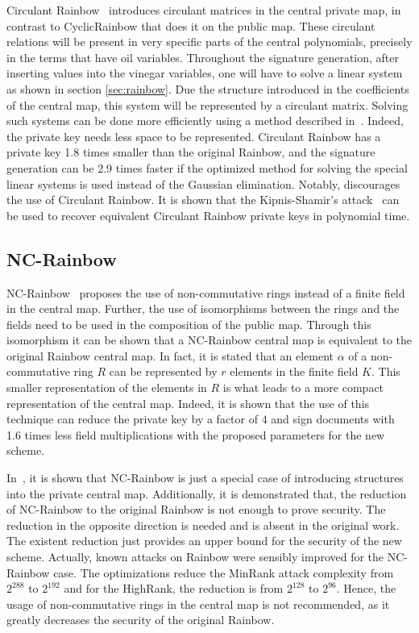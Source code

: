 \documentclass{ufsctex/ufsctex}
\begin{document}
Circulant Rainbow~\cite{peng2017circulant} introduces circulant matrices in the
central private map, in contrast to CyclicRainbow that does it on the public
map. These circulant relations will be present in very specific parts of the
central polynomials, precisely in the terms that have oil variables. Throughout
the signature generation, after inserting values into the vinegar variables,
one will have to solve a linear system as shown in section \ref{sec:rainbow}.
Due the structure introduced in the coefficients of the central map, this
system will be represented by a circulant matrix. Solving such systems can be
done more efficiently using a method described in~\cite{peng2017circulant}.
Indeed, the private key needs less space to be represented. Circulant Rainbow
has a private key 1.8 times smaller than the original Rainbow, and the
signature generation can be 2.9 times faster if the optimized method for
solving the special linear systems is used instead of the Gaussian elimination.
Notably, \cite{hashimoto2018security} discourages the use of Circulant Rainbow.
It is shown that the Kipnis-Shamir's attack~\cite{kipnis1998cryptanalysis} can
be used to recover equivalent Circulant Rainbow private keys in polynomial
time.

\subsection{NC-Rainbow}

NC-Rainbow~\cite{yasuda2012reducing} proposes the use of non-commutative rings
instead of a finite field in the central map. Further, the use of isomorphisms
between the rings and the fields need to be used in the composition of the
public map. Through this isomorphism it can be shown that a NC-Rainbow central
map is equivalent to the original Rainbow central map. In fact, it is stated
that an element $\alpha$ of a non-commutative ring $R$ can be represented by
$r$ elements in the finite field $K$. This smaller representation of the
elements in $R$ is what leads to a more compact representation of the central
map. Indeed, it is shown that the use of this technique can reduce the private
key by a factor of 4 and sign documents with 1.6 times less field
multiplications with the proposed parameters for the new scheme.

In~\cite{thomae2012quo}, it is shown that NC-Rainbow is just a special case of
introducing structures into the private central map. Additionally, it is
demonstrated that, the reduction of NC-Rainbow to the original Rainbow is not
enough to prove security. The reduction in the opposite direction is needed and
is absent in the original work. The existent reduction just provides an upper
bound for the security of the new scheme. Actually, known attacks on Rainbow
were sensibly improved for the NC-Rainbow case. The optimizations reduce the
MinRank attack complexity from $2^{288}$ to $2^{192}$ and for the HighRank, the
reduction is from $2^{128}$ to $2^{96}$. Hence, the usage of non-commutative
rings in the central map is not recommended, as it greatly decreases the
security of the original Rainbow.
\end{document}
